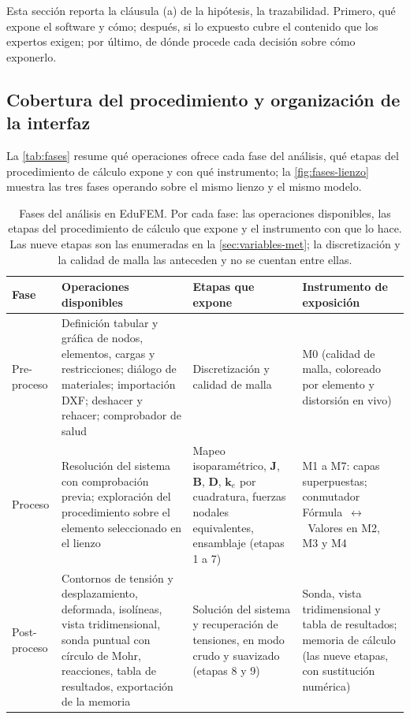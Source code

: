 Esta sección reporta la cláusula (a) de la hipótesis, la trazabilidad. Primero, qué expone el software y cómo; después, si lo expuesto cubre el contenido que los expertos exigen; por último, de dónde procede cada decisión sobre cómo exponerlo.

\subsection{Cobertura del procedimiento y organización de la interfaz}
\label{sec:cobertura-canal}

La \autoref{tab:fases} resume qué operaciones ofrece cada fase del análisis, qué etapas del procedimiento de cálculo expone y con qué instrumento; la \autoref{fig:fases-lienzo} muestra las tres fases operando sobre el mismo lienzo y el mismo modelo.

\begin{table}[!htbp]
\centering
\caption[Fases del análisis en EduFEM: operaciones y exposición del procedimiento.]{Fases del análisis en EduFEM. Por cada fase: las operaciones disponibles, las etapas del procedimiento de cálculo que expone y el instrumento con que lo hace. Las nueve etapas son las enumeradas en la \autoref{sec:variables-met}; la discretización y la calidad de malla las anteceden y no se cuentan entre ellas.}
\label{tab:fases}
{\footnotesize
\setlength{\tabcolsep}{4pt}
\begin{tabular}{@{}>{\raggedright\arraybackslash}p{1.9cm}>{\raggedright\arraybackslash}p{5.1cm}>{\raggedright\arraybackslash}p{3.3cm}>{\raggedright\arraybackslash}p{3.7cm}@{}}
\toprule
\textbf{Fase} & \textbf{Operaciones disponibles} & \textbf{Etapas que expone} & \textbf{Instrumento de exposición} \\
\midrule
Pre-proceso & Definición tabular y gráfica de nodos, elementos, cargas y restricciones; diálogo de materiales; importación DXF; deshacer y rehacer; comprobador de salud & Discretización y calidad de malla & M0 (calidad de malla, coloreado por elemento y distorsión en vivo) \\
Proceso & Resolución del sistema con comprobación previa; exploración del procedimiento sobre el elemento seleccionado en el lienzo & Mapeo isoparamétrico, $\bm{J}$, $\bm{B}$, $\bm{D}$, $\bm{k}_e$ por cuadratura, fuerzas nodales equivalentes, ensamblaje (etapas 1 a 7) & M1 a M7: capas superpuestas; conmutador Fórmula~$\leftrightarrow$~Valores en M2, M3 y M4 \\
Post-proceso & Contornos de tensión y desplazamiento, deformada, isolíneas, vista tridimensional, sonda puntual con círculo de Mohr, reacciones, tabla de resultados, exportación de la memoria & Solución del sistema y recuperación de tensiones, en modo crudo y suavizado (etapas 8 y 9) & Sonda, vista tridimensional y tabla de resultados; memoria de cálculo (las nueve etapas, con sustitución numérica) \\
\bottomrule
\end{tabular}}
\end{table}

